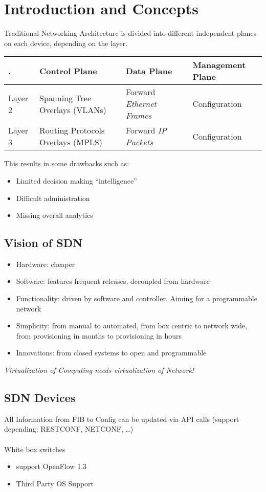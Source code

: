 \section{Introduction and Concepts}
Traditional Networking Architecture is divided into different independent planes on each device, depending on the layer.
\begin{table}[h]
	\begin{tabular}{p{}|p{}|p{}|p{}}
		. & Control Plane & Data Plane & Management Plane \\ 
		\hline
		Layer 2 & Spanning Tree Overlays (VLANs) & Forward \emph{Ethernet Frames} & Configuration \\ \hline
		Layer 3 & Routing Protocols Overlays (MPLS) & Forward \emph{IP Packets} & Configuration 
	\end{tabular}
\end{table}

\noindent
This results in some drawbacks such as:
\begin{itemize}
	\item Limited decision making ``intelligence''
	\item Difficult administration
	\item Missing overall analytics
\end{itemize}

\subsection{Vision of SDN}
\begin{itemize}
	\item Hardware: cheaper
	\item Software: features frequent releases, decoupled from hardware
	\item Functionality: driven by software and controller. Aiming for a programmable network
	\item Simplicity: from manual to automated, from box centric to network wide, from provisioning in months to provisioning in hours
	\item Innovations: from closed systems to open and programmable
\end{itemize}

\noindent
\emph{Virtualization of Computing needs virtualization of Network!}

\subsection{SDN Devices}
All Information from FIB to Config can be updated via API calls (support depending: RESTCONF, NETCONF, \ldots)
\\
\\
\noindent
White box switches 
\begin{itemize}
	\item support OpenFlow 1.3
	\item Third Party OS Support
\end{itemize}

